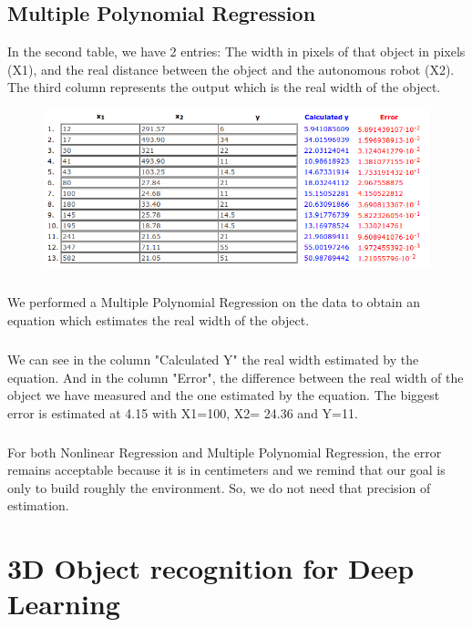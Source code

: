 \documentclass[12pt]{report}
\begin{document}
\section{Multiple Polynomial Regression}
In the second table, we have 2 entries: The width in pixels of that object in pixels (X1), and the real distance between the object and the autonomous robot (X2). The third column represents the output which is the real width of the object.
\begin{figure}[H]
	\begin{center}
		\includegraphics[scale=0.6]{res/reg3D.png}
	\end{center}
\end{figure} 

\paragraph{}
We performed a Multiple Polynomial Regression on the data to obtain an equation which estimates the real width of the object.

\paragraph{}
We can see in the column "Calculated Y" the real width estimated by the equation. And in the column "Error", the difference between the real width of the object we have measured and the one estimated by the equation. The biggest error is estimated at 4.15 with X1=100, X2= 24.36 and Y=11.

\paragraph{}
For both Nonlinear Regression and Multiple Polynomial Regression, the error remains acceptable because it is in centimeters and we remind that our goal is only to build roughly the environment. So, we do not need that precision of estimation.
	\chapter{3D Object recognition for Deep Learning}
\end{document}
